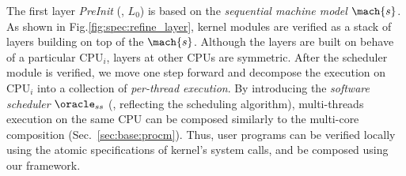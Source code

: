 The first layer \emph{PreInit} (\ie, $L_0$)
is based on the \emph{sequential machine model} $\mach{s}$.
As shown in Fig.\ref{fig:spec:refine_layer},
kernel modules
are verified as a stack of layers
building 
on top of the $\mach{s}$.
Although the layers are built
on behave of a particular $\text{CPU}_i$,
layers at other CPUs are symmetric.
After the scheduler module is verified,
we move one step forward
and decompose the execution on $\text{CPU}_i$
into a collection of \emph{per-thread execution}.
By introducing the \emph{software scheduler}
$\oracle_{ss}$ (\ie, reflecting the scheduling algorithm),
multi-threads execution on the same CPU 
can be composed similarly to the multi-core composition
(\cf Sec.~\ref{sec:base:procm}).
Thus, user programs can be verified
locally using the atomic specifications of kernel's
system calls,
and be composed using our framework.




